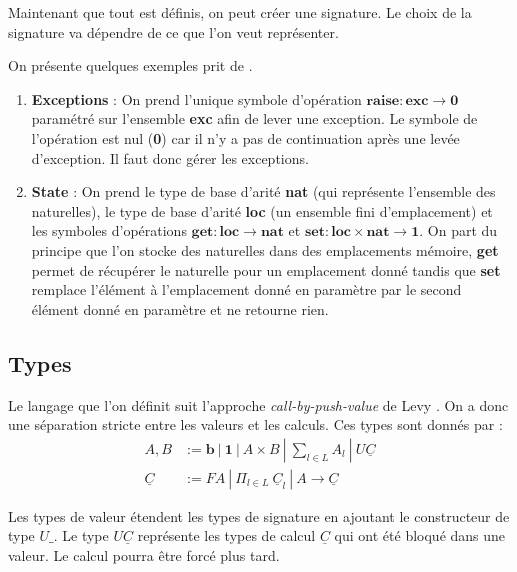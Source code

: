 	Maintenant que tout est définis, on peut créer une signature. Le choix de la signature va dépendre de ce que l'on veut représenter.

	\begin{exemple}\label{exStateExc}
		On présente quelques exemples prit de \cite{DBLP:journals/tcs/HylandPP06}.
		\begin{enumerate}
			\item[]\textbf{Exceptions} : On prend l'unique symbole d'opération $\textbf{raise} : \textbf{exc} \rightarrow \textbf{0}$ paramétré sur l'ensemble \textbf{exc} afin de lever une exception. Le symbole de l'opération est nul (\textbf{0}) car il n'y a pas de continuation après une levée d'exception. Il faut donc gérer les exceptions.
			
			\item[]\textbf{State} : On prend le type de base d'arité \textbf{nat} (qui représente l'ensemble des naturelles), le type de base d'arité \textbf{loc} (un ensemble fini d'emplacement) et les symboles d'opérations $\textbf{get} : \textbf{loc} \rightarrow \textbf{nat}$ et $\textbf{set} : \textbf{loc} \times \textbf{nat} \rightarrow \textbf{1}$. On part du principe que l'on stocke des naturelles dans des emplacements mémoire, \textbf{get} permet de récupérer le naturelle pour un emplacement donné tandis que \textbf{set} remplace l'élément à l'emplacement donné en paramètre par le second élément donné en paramètre et ne retourne rien. 
		\end{enumerate}
	\end{exemple}

\subsection{Types}
	
	Le langage que l'on définit suit l'approche \textit{call-by-push-value} de Levy \cite{DBLP:journals/lisp/Levy06}. On a donc une séparation stricte entre les valeurs et les calculs. Ces types sont donnés par : 
	\begin{align*}
		A,B &:= \textbf{b}~|~\textbf{1}~|~A \times B~|~\sum_{l \in L} A_l~|~U\underline{C}\\
		\underline{C} &:= FA~|~\Pi_{l\in L}~\underline{C}_l~|~A \rightarrow\underline{C}
	\end{align*}
	
	Les types de valeur étendent les types de signature en ajoutant le constructeur de type $U\_$. Le type $U\underline{C}$ représente les types de calcul $\underline{C}$ qui ont été bloqué dans une valeur. Le calcul pourra être forcé plus tard.
	
